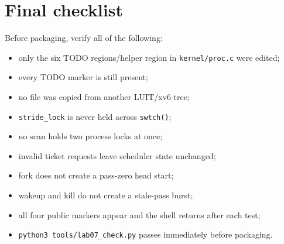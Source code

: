 \documentclass[11pt,a4paper]{article}
\newcommand{\file}[1]{\texttt{#1}}
\begin{document}
\section{Final checklist}

Before packaging, verify all of the following:

\begin{itemize}
\item only the six TODO regions/helper region in \file{kernel/proc.c} were edited;
\item every TODO marker is still present;
\item no file was copied from another LUIT/xv6 tree;
\item \file{stride\_lock} is never held across \file{swtch()};
\item no scan holds two process locks at once;
\item invalid ticket requests leave scheduler state unchanged;
\item fork does not create a pass-zero head start;
\item wakeup and kill do not create a stale-pass burst;
\item all four public markers appear and the shell returns after each test;
\item \file{python3 tools/lab07\_check.py} passes immediately before packaging.
\end{itemize}
\end{document}
